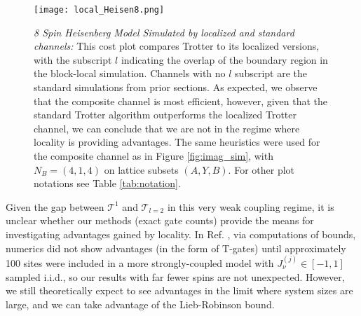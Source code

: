 \begin{figure}[htbp!]
    \centering
    \texttt{[image: local\_Heisen8.png]}
    \caption{\textit{8 Spin Heisenberg Model Simulated by localized and standard channels:} This cost plot compares Trotter to its  localized versions, with the subscript $l$ indicating the overlap of the boundary region in the block-local simulation.  Channels with no $l$ subscript are the standard simulations from prior sections. As expected, we observe that the composite channel is most efficient, however, given that the standard Trotter algorithm outperforms the localized Trotter channel, we can conclude that we are not in the regime where locality is providing advantages. The same heuristics were used for the composite channel as in Figure \ref{fig:imag_sim}, with $N_B = (4,1,4)$ on lattice subsets $(A, Y, B)$. For other plot notations see Table \ref{tab:notation}.} \label{fig:local_heisen}
\end{figure} 
\FloatBarrier

Given the gap between $\mathcal{T}^1$ and $\mathcal{T}_{l=2}$ in this very weak coupling regime, it is unclear whether our methods (exact gate counts) provide the means for investigating advantages gained by locality. In Ref. \cite{haah2021quantum}, via computations of bounds, numerics did not show advantages (in the form of T-gates) until approximately 100 sites were included in a more strongly-coupled model with $J_\nu^{(j)} \in [-1, 1]$ sampled i.i.d., so our results with far fewer spins are not unexpected. However, we still theoretically expect to see advantages in the limit where system sizes are large, and we can take advantage of the Lieb-Robinson bound.
